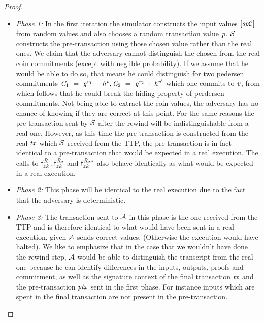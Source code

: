 \begin{proof}
    \begin{itemize}
        \item \textit{Phase 1:} In the first iteration the simulator constructs the input values $[\mathit{sp}\mathcal{C}]$ from random values and also chooses a random transaction value $\mathit{p}$.
        $\mathcal{S}$ constructs the pre-transaction using those chosen value rather than the real ones.
        We claim that the adversary cannot distinguish the chosen from the real coin commitments (except with neglible probability).
        If we assume that he would be able to do so, that means he could distinguish for two pedersen commitments $\mathit{C}_1 ~=~ \mathit{g}^{\mathit{r}_1} ~\cdot~ \mathit{h}^{\mathit{v}}, \mathit{C}_2 ~=~ \mathit{g}^{\mathit{r}_2} ~\cdot~ \mathit{h}^{{\mathit{v}}'}$ which one commits to $\mathit{v}$, from which follows that he could break the hiding property of perdersen commitments.
        Not being able to extract the coin values, the adversary has no chance of knowing if they are correct at this point.
        For the same reasons the pre-transaction sent by $\mathcal{S}$ after the rewind will be indistinguishable from a real one.
        However, as this time the pre-transaction is constructed from the real $\mathit{tx}$ which $\mathcal{S}$ received from the TTP, the pre-transaction is in fact identical to a pre-transaction that would be expected in a real execution.
        The calls to $\mathsf{f}^{\mathit{R}_1}_{zk}, \mathsf{f}^{\mathit{R}_2}_{zk}$ and $\mathsf{f}^{\mathit{R}_2*}_{zk}$ also behave identically as what would be expected in a real execution.
        \item \textit{Phase 2:} This phase will be identical to the real execution due to the fact that the adversary is deterministic.
        \item \textit{Phase 3:} The transaction sent to $\mathcal{A}$ in this phase is the one received from the TTP and is therefore identical to what would have been sent in a real execution, given $\mathcal{A}$ sends correct values. (Otherwise the execution would have halted).
        We like to emphasize that in the case that we wouldn't have done the rewind step, $\mathcal{A}$ would be able to distinguish the transcript from the real one because he can identify differences in the inputs, outputs, proofs and commitment, as well as the signature context of the final transaction $\mathit{tx}$ and the pre-transaction $\mathit{ptx}$ sent in the first phase.
        For instance inputs which are spent in the final transaction are not present in the pre-transaction.

\end{itemize}
\end{proof}
